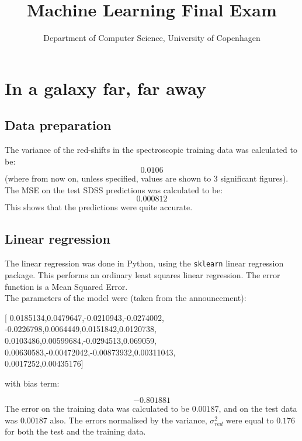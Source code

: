 \documentclass{scrartcl}
\begin{document}
\title{Machine Learning Final Exam}
\subtitle{Department of Computer Science, University of Copenhagen}

\maketitle

\section{In a galaxy far, far away}
\subsection{Data preparation}
The variance of the red-shifts in the spectroscopic training data was calculated to be:
\[ 0.0106 \]
(where from now on, unless specified, values are shown to 3 significant figures). \\

The MSE on the test SDSS predictions was calculated to be:
\[ 0.000812 \]
This shows that the predictions were quite accurate.

\subsection{Linear regression}

The linear regression was done in Python, using the \texttt{sklearn} linear regression package. This performs an ordinary least squares linear regression. The error function is a Mean Squared Error. \\

The parameters of the model were (taken from the announcement):
\begin{center}
[  0.0185134,0.0479647,-0.0210943,-0.0274002, \\
-0.0226798,0.0064449,0.0151842,0.0120738, \\
0.0103486,0.00599684,-0.0294513,0.069059, \\
0.00630583,-0.00472042,-0.00873932,0.00311043, \\
0.0017252,0.00435176]
\end{center}

with bias term:

\[ -0.801881 \]
The error on the training data was calculated to be $0.00187$, and on the test data was $0.00187$ also. The errors normalised by the variance, $\sigma^2_{red}$ were equal to $0.176$ for both the test and the training data. \\
\end{document}
